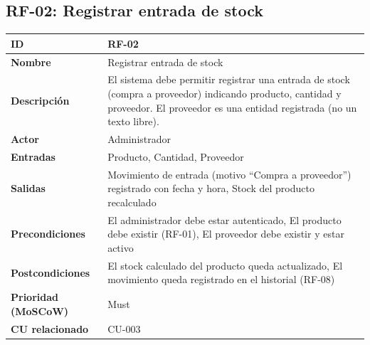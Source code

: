 \documentclass[12pt, a4paper]{article}
\begin{document}
\subsection{RF-02: Registrar entrada de stock}
\begin{center}
\renewcommand{\arraystretch}{1.4}
\begin{tabular}{|L{4cm}|L{12cm}|}
\hline
\textbf{ID} & RF-02 \\
\hline
\textbf{Nombre} & Registrar entrada de stock \\
\hline
\textbf{Descripción} & El sistema debe permitir registrar una entrada de stock (compra a proveedor) indicando producto, cantidad y proveedor. El proveedor es una entidad registrada (no un texto libre). \\
\hline
\textbf{Actor} & Administrador \\
\hline
\textbf{Entradas} & Producto, Cantidad, Proveedor \\
\hline
\textbf{Salidas} & Movimiento de entrada (motivo ``Compra a proveedor'') registrado con fecha y hora, Stock del producto recalculado \\
\hline
\textbf{Precondiciones} & El administrador debe estar autenticado, El producto debe existir (RF-01), El proveedor debe existir y estar activo \\
\hline
\textbf{Postcondiciones} & El stock calculado del producto queda actualizado, El movimiento queda registrado en el historial (RF-08) \\
\hline
\textbf{Prioridad (MoSCoW)} & Must \\
\hline
\textbf{CU relacionado} & CU-003 \\
\hline
\end{tabular}
\end{center}
\end{document}
